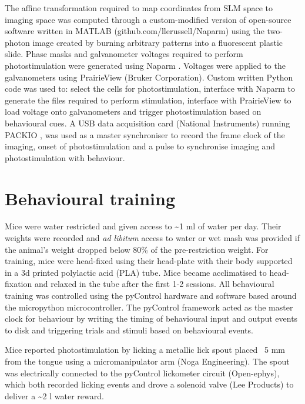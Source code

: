 The affine transformation required to map coordinates from SLM space to imaging space was computed through a custom-modified version of open-source software written in MATLAB (github.com/llerussell/Naparm) using the two-photon image created by burning arbitrary patterns into a fluorescent plastic slide. Phase masks and galvanometer voltages required to perform photostimulation were generated using Naparm \cite{russell_influence_2019}. Voltages were applied to the galvanometers using PrairieView (Bruker Corporation). Custom written Python code was used to: select the cells for photostimulation, interface with Naparm to generate the files required to perform stimulation, interface with PrairieView to load voltage onto galvanometers and trigger photostimulation based on behavioural cues. A USB data acquisition card (National Instruments) running PACKIO \cite{watson_packio_2016}, was used as a master synchroniser to record the frame clock of the imaging, onset of photostimulation and a pulse to synchronise imaging and photostimulation with behaviour.

\section{Behavioural training}

Mice were water restricted and given access to \textasciitilde1 ml of water per day. Their weights were recorded and \textit{ad libitum} access to water or wet mash was provided if the animal's weight dropped below 80\% of the pre-restriction weight. For training, mice were head-fixed using their head-plate with their body supported in a 3d printed polylactic acid (PLA) tube. Mice became acclimatised to head-fixation and relaxed in the tube after the first 1-2 sessions. All behavioural training was controlled using the pyControl hardware and software \cite{akam_pycontrol_2021} based around the micropython microcontroller. The pyControl framework acted as the master clock for behaviour by writing the timing of behavioural input and output events to disk and triggering trials and stimuli based on behavioural events.

Mice reported photostimulation by licking a metallic lick spout placed ~5 mm from the tongue using a micromanipulator arm (Noga Engineering). The spout was electrically connected to the pyControl lickometer circuit (Open-ephys), which both recorded licking events and drove a solenoid valve (Lee Products) to deliver a \textasciitilde2 \textmu l water reward.

